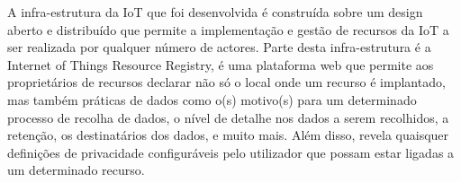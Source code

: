 \documentclass[conference]{IEEEtran}
\begin{document}

A infra-estrutura da IoT que foi desenvolvida \cite{DasPersonalized} é
construída sobre um design aberto e distribuído que permite a implementação
e gestão de recursos da IoT a ser realizada por qualquer número de actores.
Parte desta infra-estrutura é a Internet of Things Resource Registry, é uma
plataforma web que permite aos proprietários de recursos declarar não só o
local onde um recurso é implantado, mas também práticas de dados como o(s)
motivo(s) para um determinado processo de recolha de dados, o nível de
detalhe nos dados a serem recolhidos, a retenção, os destinatários dos
dados, e muito mais. Além disso, revela quaisquer definições de privacidade
configuráveis pelo utilizador que possam estar ligadas a um determinado
recurso.

\end{document}
